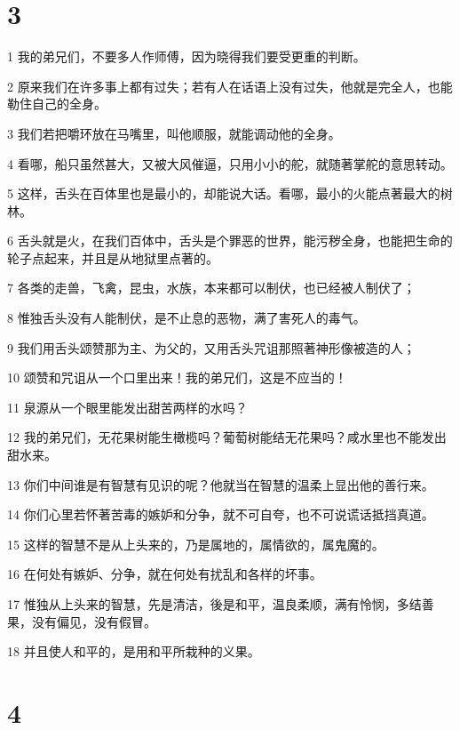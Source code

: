 \chapter{3}

\par 1 我的弟兄们，不要多人作师傅，因为晓得我们要受更重的判断。
\par 2 原来我们在许多事上都有过失；若有人在话语上没有过失，他就是完全人，也能勒住自己的全身。
\par 3 我们若把嚼环放在马嘴里，叫他顺服，就能调动他的全身。
\par 4 看哪，船只虽然甚大，又被大风催逼，只用小小的舵，就随著掌舵的意思转动。
\par 5 这样，舌头在百体里也是最小的，却能说大话。看哪，最小的火能点著最大的树林。
\par 6 舌头就是火，在我们百体中，舌头是个罪恶的世界，能污秽全身，也能把生命的轮子点起来，并且是从地狱里点著的。
\par 7 各类的走兽，飞禽，昆虫，水族，本来都可以制伏，也已经被人制伏了；
\par 8 惟独舌头没有人能制伏，是不止息的恶物，满了害死人的毒气。
\par 9 我们用舌头颂赞那为主、为父的，又用舌头咒诅那照著神形像被造的人；
\par 10 颂赞和咒诅从一个口里出来！我的弟兄们，这是不应当的！
\par 11 泉源从一个眼里能发出甜苦两样的水吗？
\par 12 我的弟兄们，无花果树能生橄榄吗？葡萄树能结无花果吗？咸水里也不能发出甜水来。
\par 13 你们中间谁是有智慧有见识的呢？他就当在智慧的温柔上显出他的善行来。
\par 14 你们心里若怀著苦毒的嫉妒和分争，就不可自夸，也不可说谎话抵挡真道。
\par 15 这样的智慧不是从上头来的，乃是属地的，属情欲的，属鬼魔的。
\par 16 在何处有嫉妒、分争，就在何处有扰乱和各样的坏事。
\par 17 惟独从上头来的智慧，先是清洁，後是和平，温良柔顺，满有怜悯，多结善果，没有偏见，没有假冒。
\par 18 并且使人和平的，是用和平所栽种的义果。

\chapter{4}

